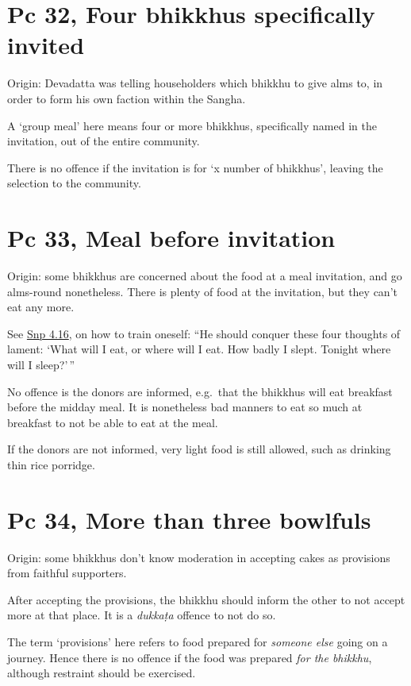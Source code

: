\section{Pc 32, Four bhikkhus specifically invited}

Origin: Devadatta was telling householders which bhikkhu to give alms
to, in order to form his own faction within the Sangha.

A `group meal' here means four or more bhikkhus, specifically named in
the invitation, out of the entire community.

There is no offence if the invitation is for `x number of bhikkhus',
leaving the selection to the community.

\section{Pc 33, Meal before invitation}

Origin: some bhikkhus are concerned about the food at a meal invitation,
and go alms-round nonetheless. There is plenty of food at the
invitation, but they can't eat any more.

See
\href{https://www.accesstoinsight.org/tipitaka/kn/snp/snp.4.16.than.html}{Snp
4.16}, on how to train oneself: ``He should conquer these four thoughts
of lament: `What will I eat, or where will I eat. How badly I slept.
Tonight where will I sleep?'\,''

No offence is the donors are informed, e.g.~that the bhikkhus will eat
breakfast before the midday meal. It is nonetheless bad manners to eat
so much at breakfast to not be able to eat at the meal.

If the donors are not informed, very light food is still allowed, such
as drinking thin rice porridge.

\section{Pc 34, More than three bowlfuls}

Origin: some bhikkhus don't know moderation in accepting cakes as
provisions from faithful supporters.

\enlargethispage{\baselineskip}

After accepting the provisions, the bhikkhu should inform the other to
not accept more at that place. It is a \emph{dukkaṭa} offence to not do
so.

The term `provisions' here refers to food prepared for \emph{someone
else} going on a journey. Hence there is no offence if the food was
prepared \emph{for the bhikkhu}, although restraint should be exercised.

